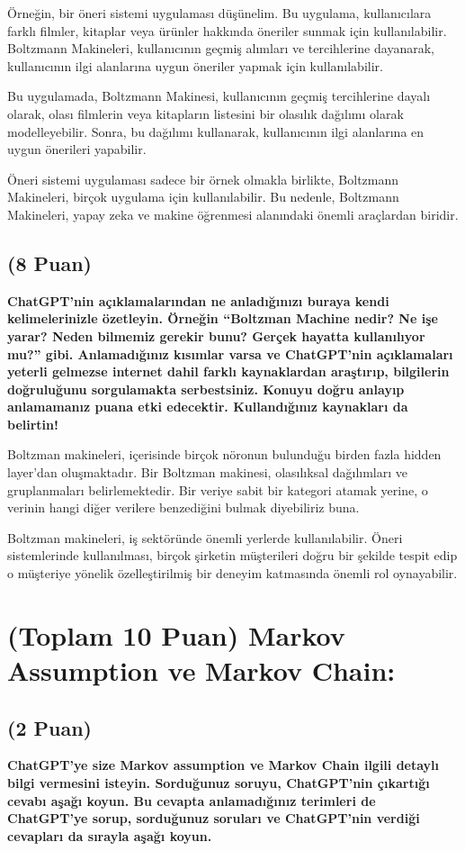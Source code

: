 \documentclass[11pt]{article}
\begin{document}
Örneğin, bir öneri sistemi uygulaması düşünelim. Bu uygulama, kullanıcılara farklı filmler, kitaplar veya ürünler hakkında öneriler sunmak için kullanılabilir. Boltzmann Makineleri, kullanıcının geçmiş alımları ve tercihlerine dayanarak, kullanıcının ilgi alanlarına uygun öneriler yapmak için kullanılabilir.

Bu uygulamada, Boltzmann Makinesi, kullanıcının geçmiş tercihlerine dayalı olarak, olası filmlerin veya kitapların listesini bir olasılık dağılımı olarak modelleyebilir. Sonra, bu dağılımı kullanarak, kullanıcının ilgi alanlarına en uygun önerileri yapabilir.

Öneri sistemi uygulaması sadece bir örnek olmakla birlikte, Boltzmann Makineleri, birçok uygulama için kullanılabilir. Bu nedenle, Boltzmann Makineleri, yapay zeka ve makine öğrenmesi alanındaki önemli araçlardan biridir.

\subsection{(8 Puan)} \textbf{ChatGPT’nin açıklamalarından ne anladığınızı buraya kendi kelimelerinizle özetleyin. Örneğin ``Boltzman Machine nedir? Ne işe yarar? Neden bilmemiz gerekir bunu? Gerçek hayatta kullanılıyor mu?'' gibi. Anlamadığınız kısımlar varsa ve ChatGPT’nin açıklamaları yeterli gelmezse internet dahil farklı kaynaklardan araştırıp, bilgilerin doğruluğunu sorgulamakta serbestsiniz. Konuyu doğru anlayıp anlamamanız puana etki edecektir. Kullandığınız kaynakları da belirtin!}

Boltzman makineleri, içerisinde birçok nöronun bulunduğu birden fazla hidden layer'dan oluşmaktadır. Bir Boltzman makinesi, olasılıksal dağılımları ve gruplanmaları belirlemektedir. Bir veriye sabit bir kategori atamak yerine, o verinin hangi diğer verilere benzediğini bulmak diyebiliriz buna. 

Boltzman makineleri, iş sektöründe önemli yerlerde kullanılabilir. Öneri sistemlerinde kullanılması, birçok şirketin müşterileri doğru bir şekilde tespit edip o müşteriye yönelik özelleştirilmiş bir deneyim katmasında önemli rol oynayabilir.

\section{(Toplam 10 Puan) Markov Assumption ve Markov Chain:}

\subsection{(2 Puan)} \textbf{ChatGPT’ye size Markov assumption ve Markov Chain ilgili detaylı bilgi vermesini isteyin. Sorduğunuz soruyu, ChatGPT'nin çıkartığı cevabı aşağı koyun. Bu cevapta anlamadığınız terimleri de ChatGPT’ye sorup, sorduğunuz soruları ve ChatGPT’nin verdiği cevapları da sırayla aşağı koyun.}
\end{document}
